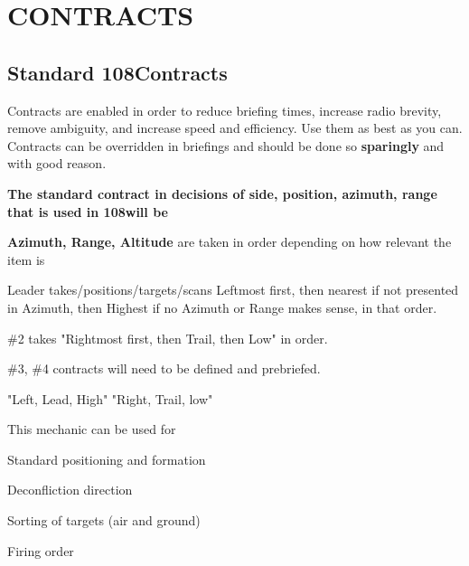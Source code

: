 \section{CONTRACTS}

\subsection{Standard 108\th Contracts}

Contracts are enabled in order to reduce briefing times, increase radio
brevity, remove ambiguity, and increase speed and efficiency. Use them as best
as you can. Contracts can be overridden in briefings and should be done so
\textbf{sparingly} and with good reason.

\textbf{The standard contract in decisions of side, position, azimuth, range
that is used in 108\th will be}

{
    \begin{subsectionenumerate}
    \setlength{\topsep}{0em}

    \item \textbf{Azimuth, Range, Altitude} are taken in order depending on how
      relevant the item is

    \item Leader takes/positions/targets/scans Leftmost first, then nearest if
      not presented in Azimuth, then Highest if no Azimuth or Range makes
      sense, in that order.

    \item \#2 takes "Rightmost first, then Trail, then Low" in order.

    \item \#3, \#4 contracts will need to be defined and prebriefed.

    \item "Left, Lead, High" "Right, Trail, low"\\[1em]

    \end{subsectionenumerate}

    \vspace{-2em}
    This mechanic can be used for
    \setlength{\parskip}{0em}

    \begin{subsectionenumerate}
      \setcounter{enumi}{5}
      \item Standard positioning and formation

      \item Deconfliction direction

      \item Sorting of targets (air and ground)

      \item Firing order
    \end{subsectionenumerate}
}


